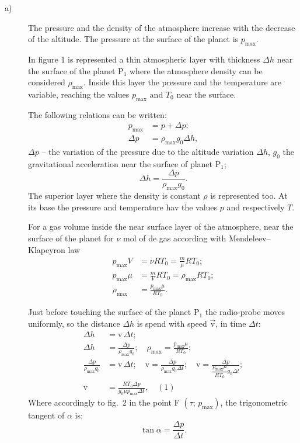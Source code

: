 

\begin{description}
\item[a)]
The pressure and the density of the atmosphere increase with the decrease of the altitude.
The pressure at the surface of the planet is $p_{\max}$.

In figure 1 is represented a thin atmospheric layer with thickness $\Delta h$ near the surface
of the planet P$_1$ where the atmosphere density can be considered $\rho_{\max}$. Inside this
layer the pressure and the temperature are variable, reaching the values $p_{\max}$ and $T_0$
near the surface.

The following relations can be written:
\begin{align*}
p_{\max} &= p + \Delta p;\\
\Delta p &= \rho_{\max}g_0\Delta h,
\end{align*}
$\Delta p$ -- the variation of the pressure due to the altitude variation $\Delta h$, $g_0$
the gravitational acceleration near the surface of planet P$_1$;
\[
\Delta h = \frac{\Delta p}{\rho_{\max}g_0}.
\]
The superior layer where the density is constant $\rho$ is represented too. At its base the
pressure and temperature hav the values $p$ and respectively $T$. %

For a gas volume inside the near surface layer of the atmosphere, near the surface of the
planet for $\nu$ mol of de gas according with Mendeleev--Klapeyron law %
\begin{align*}
p_{\max}V &= \nu RT_0 = \frac{m}{\mu}RT_0;\\
p_{\max}\mu &= \frac{m}{V}RT_0 = \rho_{\max}RT_0;\\
\rho_{\max} &= \frac{p_{\max}\mu}{RT_0}.
\end{align*}

Just before touching the surface of the planet P$_1$ the radio-probe moves uniformly, so the
distance $\Delta h$ is spend with speed $\vec{\mathrm{v}}$, in time $\Delta t$: %
\begin{align*}
\Delta h &= \mathrm{v}\,\Delta t;\\
\Delta h &= \frac{\Delta p}{\rho_{\max}g_0};\quad
\rho_{\max} = \frac{p_{\max}\mu}{RT_0};\\
\frac{\Delta p}{\rho_{\max}g_0} &= \mathrm{v}\,\Delta t;\quad
\mathrm{v} = \frac{\Delta p}{\rho_{\max}g_0\Delta t};\quad
\mathrm{v} = \frac{\Delta p}{\dfrac{p_{\max}\mu}{RT_0}g_0\Delta t};\\
\mathrm{v} &= \frac{RT_0\Delta p}{g_0\mu p_{\max}\Delta t},\quad(1)
\end{align*}
Where accordingly to fig.~2 in the point F $(\tau;\,p_{\max})$, the trigonometric tangent of
$\alpha$ is:
\[
\tan\alpha = \frac{\Delta p}{\Delta t}.
\]


\end{description}
